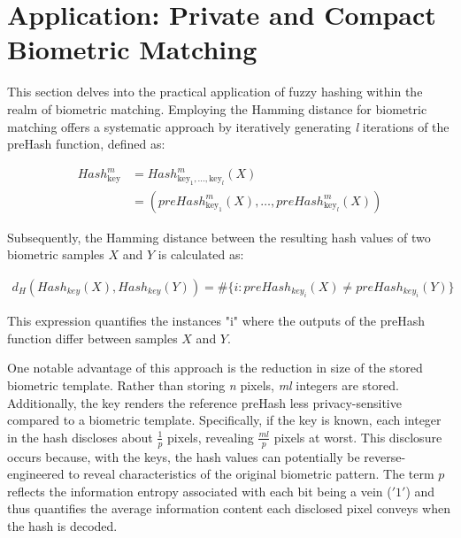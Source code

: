 \newpage
\section{Application: Private and Compact Biometric Matching}
\label{Application: Private and Compact Biometric Matching}

This section delves into the practical application of fuzzy hashing within the realm of biometric matching. Employing the Hamming distance for biometric matching offers a systematic approach by iteratively generating \textit{l} iterations of the preHash function, defined as:

\begin{equation}
    \begin{aligned}
        Hash_{\text{key}}^m &= Hash_{\text{key}_1, \ldots, \text{key}_l}^m(X)\\
        &= (preHash_{\text{key}_1}^m(X), \ldots, preHash_{\text{key}_l}^m(X))
    \end{aligned}
\end{equation}

Subsequently, the Hamming distance between the resulting hash values of two biometric samples \(X\) and \(Y\) is calculated as:

\begin{equation}
    \begin{aligned}
        \label{eq:HammingDist}
        d_H(Hash_{key}(X), Hash_{key}(Y)) = \# \{i: preHash_{key_i}(X) \neq preHash_{key_i}(Y)\}
    \end{aligned}
\end{equation}

This expression quantifies the instances "i" where the outputs of the preHash function differ between samples \(X\) and \(Y\).

One notable advantage of this approach is the reduction in size of the stored biometric template. Rather than storing \textit{n} pixels, \textit{ml} integers are stored. Additionally, the key renders the reference preHash less privacy-sensitive compared to a biometric template. Specifically, if the key is known, each integer in the hash discloses about \(\frac{1}{p}\) pixels, revealing \(\frac{ml}{p}\) pixels at worst. This disclosure occurs because, with the keys, the hash values can potentially be reverse-engineered to reveal characteristics of the original biometric pattern. The term \(p\)​ reflects the information entropy associated with each bit being a vein (\('1'\)) and thus quantifies the average information content each disclosed pixel conveys when the hash is decoded.

